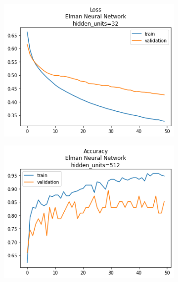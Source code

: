 \documentclass[12pt, a4paper]{article}
\begin{document}
\begin{figure}
\begin{subfigure}{0.45\linewidth}
    \end{subfigure}
    \hfill
    \begin{subfigure}{0.45\linewidth}
        \includegraphics[width=0.9\linewidth]{images/q1/elman/loss_Elman Neural Networkhidden_units=32.png}
    \end{subfigure}
    \begin{subfigure}{0.45\linewidth}
        \includegraphics[width=0.9\linewidth]{images/q1/elman/acc_Elman Neural Networkhidden_units=512.png}
    \end{subfigure}
    \hfill
    \begin{subfigure}{0.45\linewidth}

\end{subfigure}
\end{figure}
\end{document}
